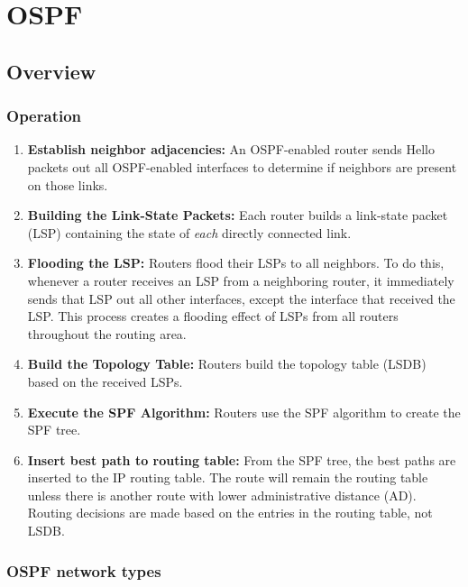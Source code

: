 \chapter{OSPF}

\section{Overview}

\subsection{Operation}

\begin{enumerate}
\item \textbf{Establish neighbor adjacencies:} An OSPF-enabled router sends Hello packets out all OSPF-enabled interfaces to determine if neighbors are present on those links.

\item \textbf{Building the Link-State Packets:} Each router builds a link-state packet (LSP) containing the state of \emph{each} directly connected link. 

\item \textbf{Flooding the LSP:} Routers flood their LSPs to all neighbors. To do this, whenever a router receives an LSP from a neighboring router, it immediately sends that LSP out all other interfaces, except the interface that received the LSP. This process creates a flooding effect of LSPs from all routers throughout the routing area.

\item \textbf{Build the Topology Table:} Routers build the topology table (LSDB) based on the received LSPs. 

\item \textbf{Execute the SPF Algorithm:} Routers use the SPF algorithm to create the SPF tree.

\item \textbf{Insert best path to routing table:} From the SPF tree, the best paths are inserted to the IP routing table. The route will remain the routing table unless there is another route with lower administrative distance (AD). Routing decisions are made based on the entries in the routing table, not LSDB.
\end{enumerate}
	
\subsection{OSPF network types}


